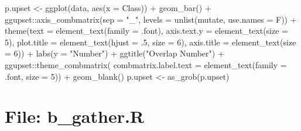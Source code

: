 \documentclass[
]{article}
\newenvironment{Shaded}{\begin{snugshade}}{\end{snugshade}}
\newcommand{\AttributeTok}[1]{\textcolor[rgb]{0.77,0.63,0.00}{#1}}
\newcommand{\DecValTok}[1]{\textcolor[rgb]{0.00,0.00,0.81}{#1}}
\newcommand{\FunctionTok}[1]{\textcolor[rgb]{0.00,0.00,0.00}{#1}}
\newcommand{\NormalTok}[1]{#1}
\newcommand{\OtherTok}[1]{\textcolor[rgb]{0.56,0.35,0.01}{#1}}
\newcommand{\SpecialCharTok}[1]{\textcolor[rgb]{0.00,0.00,0.00}{#1}}
\newcommand{\StringTok}[1]{\textcolor[rgb]{0.31,0.60,0.02}{#1}}
\begin{document}
\begin{Shaded}
\begin{Highlighting}[]
\NormalTok{p.upset }\OtherTok{\textless{}{-}} \FunctionTok{ggplot}\NormalTok{(data, }\FunctionTok{aes}\NormalTok{(}\AttributeTok{x =}\NormalTok{ Class)) }\SpecialCharTok{+}
  \FunctionTok{geom\_bar}\NormalTok{() }\SpecialCharTok{+}
\NormalTok{  ggupset}\SpecialCharTok{::}\FunctionTok{axis\_combmatrix}\NormalTok{(}\AttributeTok{sep =} \StringTok{"\_"}\NormalTok{, }\AttributeTok{levels =} \FunctionTok{unlist}\NormalTok{(mutate, }\AttributeTok{use.names =}\NormalTok{ F)) }\SpecialCharTok{+}
  \FunctionTok{theme}\NormalTok{(}\AttributeTok{text =} \FunctionTok{element\_text}\NormalTok{(}\AttributeTok{family =}\NormalTok{ .font),}
    \AttributeTok{axis.text.y =} \FunctionTok{element\_text}\NormalTok{(}\AttributeTok{size =} \DecValTok{5}\NormalTok{),}
    \AttributeTok{plot.title =} \FunctionTok{element\_text}\NormalTok{(}\AttributeTok{hjust =}\NormalTok{ .}\DecValTok{5}\NormalTok{, }\AttributeTok{size =} \DecValTok{6}\NormalTok{),}
    \AttributeTok{axis.title =} \FunctionTok{element\_text}\NormalTok{(}\AttributeTok{size =} \DecValTok{6}\NormalTok{)) }\SpecialCharTok{+}
  \FunctionTok{labs}\NormalTok{(}\AttributeTok{y =} \StringTok{"Number"}\NormalTok{) }\SpecialCharTok{+}
  \FunctionTok{ggtitle}\NormalTok{(}\StringTok{"Overlap Number"}\NormalTok{) }\SpecialCharTok{+}
\NormalTok{  ggupset}\SpecialCharTok{::}\FunctionTok{theme\_combmatrix}\NormalTok{(}
    \AttributeTok{combmatrix.label.text =} \FunctionTok{element\_text}\NormalTok{(}\AttributeTok{family =}\NormalTok{ .font, }\AttributeTok{size =} \DecValTok{5}\NormalTok{)) }\SpecialCharTok{+}
  \FunctionTok{geom\_blank}\NormalTok{()}
\NormalTok{p.upset }\OtherTok{\textless{}{-}} \FunctionTok{as\_grob}\NormalTok{(p.upset)}
\end{Highlighting}
\end{Shaded}

\hypertarget{file-b_gather.r}{%
\section{File: b\_gather.R}\label{file-b_gather.r}}
\end{document}
